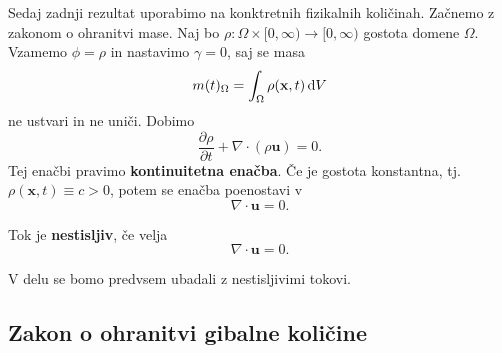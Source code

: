 \documentclass[mat2, tisk]{fmfdelo}
\newcommand{\bd}{\textbf}
\begin{document}
Sedaj zadnji rezultat uporabimo na konktretnih fizikalnih količinah. 
Začnemo z zakonom o ohranitvi mase. Naj bo $\rho: \Omega \times [0, \infty) \rightarrow [0, \infty)$
gostota domene $\Omega$. Vzamemo $\phi = \rho$ in nastavimo $\gamma = 0$, saj se 
masa 
$$
m(t)_\Omega = \int_\Omega \rho(\bd{x}, t) \dif V
$$
ne ustvari in ne uniči. Dobimo 
\begin{equation}
\frac{\partial \rho}{\partial t} + \nabla \cdot (\rho \bd{u}) = 0.
\end{equation}
Tej enačbi pravimo \bd{kontinuitetna enačba}. Če je gostota konstantna, tj. $\rho(\bd{x}, t) \equiv c > 0$, potem se enačba poenostavi v  
\begin{equation}
\nabla \cdot \bd{u} = 0.
\end{equation}

\begin{definicija}
  Tok je \textbf{nestisljiv}, če velja 
  \begin{equation}
  \label{ohranitev mase}
    \nabla \cdot \bd{u} = 0.    
  \end{equation}
\end{definicija}

V delu se bomo predvsem ubadali z nestisljivimi tokovi.
\subsection{Zakon o ohranitvi gibalne količine}
\end{document}
